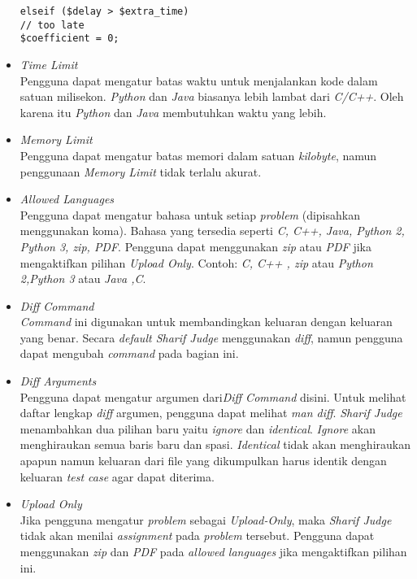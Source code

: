 \begin{itemize}
\begin{lstlisting}[basicstyle=\ttfamily, frame=single,
columns=fullflexible, keepspaces=true, breaklines=true]
elseif ($delay > $extra_time)
// too late
$coefficient = 0;
\end{lstlisting}
	
	\item \textit{Time Limit} \\
	Pengguna dapat mengatur batas waktu untuk menjalankan kode dalam satuan milisekon. \textit{Python} dan \textit{Java} biasanya lebih lambat dari \textit{C/C++}.	Oleh karena itu \textit{Python} dan \textit{Java} membutuhkan waktu yang lebih.
	
	\item \textit{Memory Limit} \\
	Pengguna dapat mengatur batas memori dalam satuan \textit{kilobyte}, namun penggunaan \textit{Memory Limit} tidak terlalu akurat.
	
	\item \textit{Allowed Languages} \\
	Pengguna dapat mengatur bahasa untuk setiap \textit{problem} (dipisahkan menggunakan koma). Bahasa yang tersedia seperti \textit{C, C++, Java, Python 2, Python 3, zip, PDF}. Pengguna dapat menggunakan \textit{zip} atau \textit{PDF} jika mengaktifkan pilihan \textit{Upload Only}. Contoh: \textit{C, C++ , zip} atau \textit{Python 2,Python 3} atau \textit{Java ,C}.
	
	\item \textit{Diff Command} \\
	\textit{Command} ini digunakan untuk membandingkan keluaran dengan keluaran yang benar. Secara \textit{default Sharif Judge} menggunakan \textit{diff}, namun pengguna dapat mengubah \textit{command} pada bagian ini.
	
	\item \textit{Diff Arguments} \\
	Pengguna dapat mengatur argumen dari\textit{Diff Command} disini. Untuk melihat daftar lengkap \textit{diff} argumen, pengguna dapat melihat \textit{man diff}. \textit{Sharif Judge} menambahkan dua pilihan baru yaitu \textit{ignore} dan \textit{identical}. \textit{Ignore} akan menghiraukan semua baris baru dan spasi. \textit{Identical} tidak akan menghiraukan apapun namun keluaran dari file yang dikumpulkan harus identik dengan keluaran \textit{test case} agar dapat diterima.
	
	\item \textit{Upload Only} \\
	Jika pengguna mengatur \textit{problem} sebagai \textit{Upload-Only}, maka \textit{Sharif Judge} tidak akan menilai \textit{assignment} pada \textit{problem} tersebut. Pengguna dapat menggunakan \textit{zip} dan \textit{PDF} pada \textit{allowed languages} jika mengaktifkan pilihan ini.
\end{itemize}

